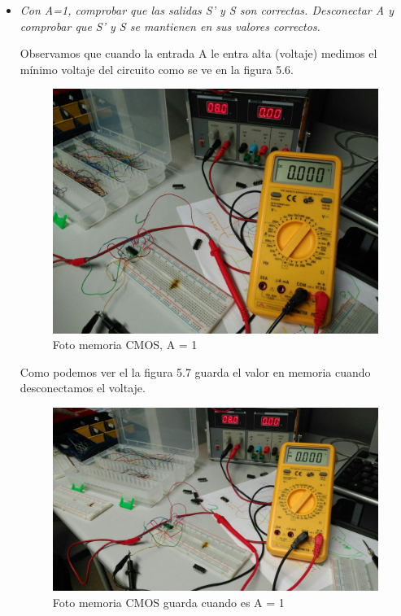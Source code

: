 \documentclass[paper=a4, fontsize=11pt]{scrartcl} %
\numberwithin{equation}{section} %
\numberwithin{figure}{section} %
\numberwithin{table}{section} %
\begin{document}
\begin{itemize}
	\item \textit{Con A=1, comprobar que las salidas S' y S son correctas. Desconectar A y comprobar que S' y S se mantienen en sus valores correctos.} \newline
	
	Observamos que cuando la entrada A le entra alta (voltaje) medimos el mínimo voltaje del circuito como se ve en la figura 5.6.
	
	\begin{figure}[H]
		\centering
		\includegraphics[scale=0.25]{image/NOT5B3}
		\caption{Foto memoria CMOS, A = 1}
		\label{fig:prac-5a-5B3}
	\end{figure}
	
	Como podemos ver el la figura 5.7 guarda el valor en memoria cuando desconectamos el voltaje.
	
	\begin{figure}[H]
		\centering
		\includegraphics[scale=0.4]{image/NOT5B4}
		\caption{Foto memoria CMOS guarda cuando es A = 1}
		\label{fig:prac-5a-5B4}
	\end{figure}
\end{itemize}
 
\end{document}
